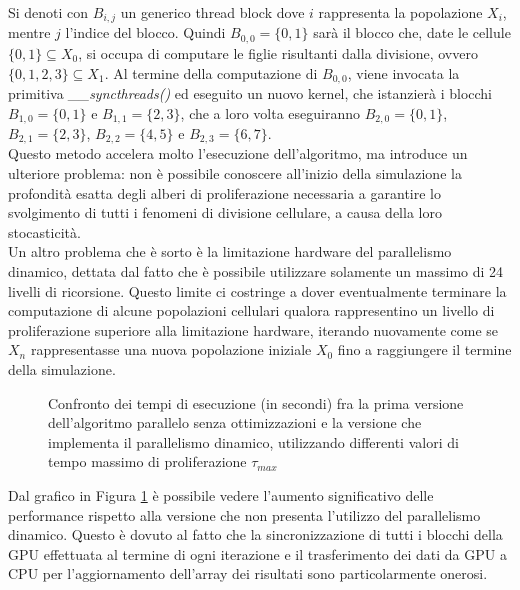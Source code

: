 Si denoti con $B_{i,j}$ un generico thread block dove
$i$ rappresenta la popolazione $X_{i}$, mentre $j$ l'indice del blocco.
Quindi $B_{0,0} = \{0, 1\}$ sarà il blocco che, date le
cellule $\{0, 1\} \subseteq X_{0}$, si occupa di
computare le figlie risultanti dalla divisione, ovvero
$\{0, 1, 2, 3\} \subseteq X_{1}$.
Al termine della computazione di $B_{0,0}$, viene invocata la primitiva 
\textit{\_\_syncthreads()} ed eseguito un nuovo kernel, che istanzierà
i blocchi $B_{1,0} = \{0, 1\}$ e $B_{1,1} = \{2, 3\}$, che a loro volta
eseguiranno $B_{2,0} = \{0, 1\}$, $B_{2,1} = \{2, 3\}$,
$B_{2,2} = \{4, 5\}$ e $B_{2,3} = \{6, 7\}$.
\\
Questo metodo accelera molto l'esecuzione dell'algoritmo, ma introduce un
ulteriore problema: non è possibile conoscere all'inizio della simulazione la
profondità esatta degli alberi di proliferazione necessaria a garantire lo
svolgimento di tutti i fenomeni di divisione cellulare, a causa della 
loro stocasticità.
\\
Un altro problema che è sorto è la limitazione hardware del parallelismo
dinamico, dettata dal fatto che è possibile utilizzare solamente un massimo
di 24 livelli di ricorsione. Questo limite ci costringe a dover
eventualmente terminare la computazione di alcune popolazioni cellulari qualora
rappresentino un livello di proliferazione superiore alla limitazione hardware,
iterando nuovamente come se $X_{n}$ rappresentasse una nuova
popolazione iniziale $X_{0}$ fino a raggiungere il termine della simulazione.
\begin{figure}[t]
    \centering
    \caption{Confronto dei tempi di esecuzione (in secondi) fra la prima 
    versione dell'algoritmo parallelo senza ottimizzazioni e la versione
    che implementa il parallelismo dinamico, utilizzando differenti valori di
    tempo massimo di proliferazione $\tau_{max}$}
    \label{chart:original-dynamic}
\end{figure}
Dal grafico in Figura \ref{chart:original-dynamic} è possibile vedere
l'aumento significativo delle
performance rispetto alla versione che non presenta l'utilizzo del
parallelismo dinamico. Questo è dovuto al fatto che la
sincronizzazione di tutti i blocchi della GPU effettuata al termine di ogni
iterazione e il trasferimento
dei dati da GPU a CPU per l'aggiornamento dell'array dei risultati sono
particolarmente onerosi.

